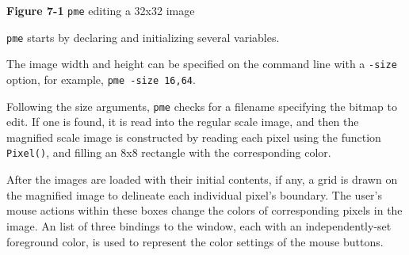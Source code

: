 {\sffamily\bfseries Figure 7-1}
{\sffamily \texttt{pme} editing a 32x32 image}

\bigskip

\texttt{pme} starts by declaring and initializing several variables.

\bigskip


The image width and height can be specified on the command line with a
\texttt{-size} option, for example, \texttt{pme -size 16,64}.


Following the size arguments, \texttt{pme} checks for a filename
specifying the bitmap to edit. If one is found, it is read into the
regular scale image, and then the magnified scale image is constructed
by reading each pixel using the function \texttt{Pixel()}, and filling
an 8x8 rectangle with the corresponding color.


After the images are loaded with their initial contents, if any, a
grid is drawn on the magnified image to delineate each individual
pixel's boundary. The user's mouse actions within these boxes change
the colors of corresponding pixels in the image. An list of three
bindings to the window, each with an independently-set foreground
color, is used to represent the color settings of the mouse buttons.

